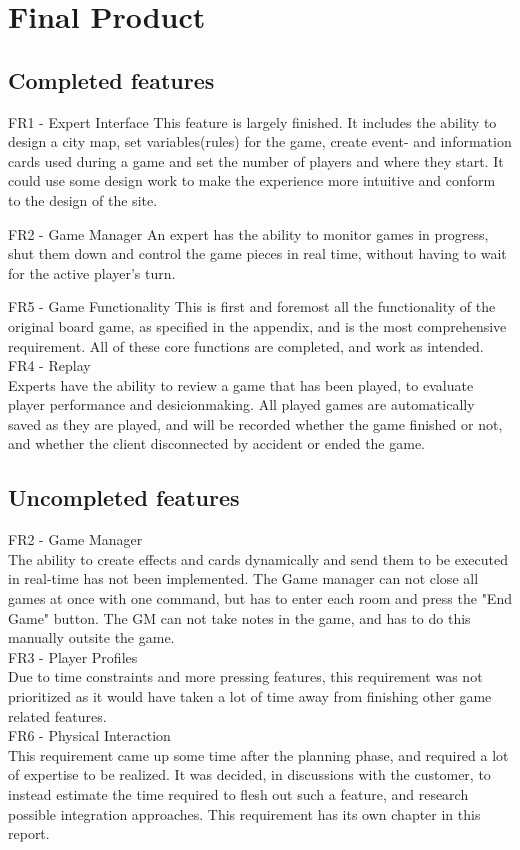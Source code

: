 \chapter{Final Product}

\section{Completed features}
FR1 - Expert Interface
This feature is largely finished. It includes the ability to design a city map, set variables(rules) for the game, create event- and information cards used during a game and set the number of players and where they start. It could use some design work to make the experience more intuitive and conform to the design of the site.

FR2 - Game Manager
An expert has the ability to monitor games in progress, shut them down and control the game pieces in real time, without having to wait for the active player's turn.

FR5 - Game Functionality
This is first and foremost all the functionality of the original board game, as specified in the appendix, and is the most comprehensive requirement. All of these core functions are completed, and work as intended.
\\
FR4 - Replay\\
Experts have the ability to review a game that has been played, to evaluate player performance and desicionmaking. All played games are automatically saved as they are played, and will be recorded whether the game finished or not, and whether the client disconnected by accident or ended the game.

\section{Uncompleted features}

FR2 - Game Manager \\
The ability to create effects and cards dynamically and send them to be executed in real-time has not been implemented. The Game manager can not close all games at once with one command, but has to enter each room and press the "End Game" button. The GM can not take notes in the game, and has to do this manually outsite the game.
\\
FR3 - Player Profiles\\
Due to time constraints and more pressing features, this requirement was not prioritized as it would have taken a lot of time away from finishing other game related features.
\\
FR6 - Physical Interaction\\
This requirement came up some time after the planning phase, and required a lot of expertise to be realized. It was decided, in discussions with the customer, to instead estimate the time required to flesh out such a feature, and research possible integration approaches. This requirement has its own chapter in this report.
\\

